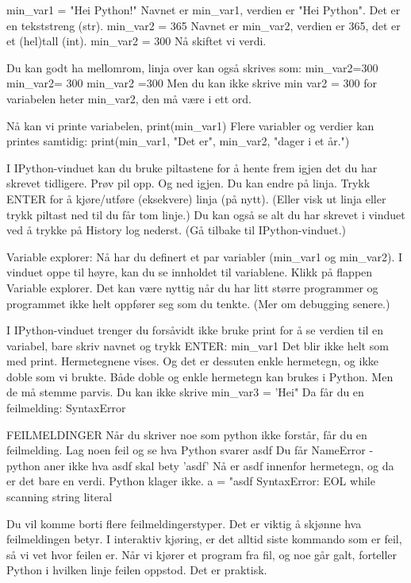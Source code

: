 min{\_}var1 = "Hei Python!"
Navnet er min{\_}var1, verdien er "Hei Python". Det er en tekststreng (str). 
min{\_}var2 = 365
Navnet er min{\_}var2, verdien er 365, det er et (hel)tall (int). 
min{\_}var2 = 300
Nå skiftet vi verdi. 

Du kan godt ha mellomrom, linja over kan også skrives som: 
min{\_}var2=300
min{\_}var2= 300
min{\_}var2 =300
Men du kan ikke skrive
min var2 = 300
for variabelen heter min{\_}var2, den må være i ett ord. 

Nå kan vi printe variabelen, 
print(min{\_}var1)
Flere variabler og verdier kan printes samtidig: 
print(min{\_}var1, "Det er", min{\_}var2, "dager i et år.")

\iffalse

I IPython-vinduet kan du bruke piltastene for å hente frem igjen det du har skrevet tidligere. 
Prøv pil opp. Og ned igjen. 
Du kan endre på linja. 
Trykk ENTER for å kjøre/utføre (eksekvere) linja (på nytt).
(Eller visk ut linja eller trykk piltast ned til du får tom linje.)
Du kan også se alt du har skrevet i vinduet ved å trykke på History log nederst.
(Gå tilbake til IPython-vinduet.) 


Variable explorer:
Nå har du definert et par variabler (min_var1 og min_var2).
I vinduet oppe til høyre, kan du se innholdet til variablene. 
Klikk på flappen Variable explorer.
Det kan være nyttig når du har litt større programmer og programmet ikke helt
oppfører seg som du tenkte.
(Mer om debugging senere.) 


I IPython-vinduet trenger du forsåvidt ikke bruke print for å se verdien
til en variabel, bare skriv navnet og trykk ENTER: 
min_var1
Det blir ikke helt som med print. Hermetegnene vises.
Og det er dessuten enkle hermetegn, og ikke doble som vi brukte.
Både doble og enkle hermetegn kan brukes i Python. 
Men de må stemme parvis. Du kan ikke skrive
min_var3 = 'Hei"
Da får du en feilmelding: SyntaxError 



FEILMELDINGER
Når du skriver noe som python ikke forstår, får du en feilmelding. 
Lag noen feil og se hva Python svarer
asdf
Du får NameError - python aner ikke hva asdf skal bety 
'asdf'
Nå er asdf innenfor hermetegn, og da er det bare en verdi. Python klager ikke.
a = "asdf
SyntaxError: EOL while scanning string literal

Du vil komme borti flere feilmeldingerstyper. 
Det er viktig å skjønne hva feilmeldingen betyr.  
I interaktiv kjøring, er det alltid siste kommando som er feil, så vi vet hvor feilen er. 
Når vi kjører et program fra fil, og noe går galt, forteller Python i hvilken linje
feilen oppstod. Det er praktisk. 


